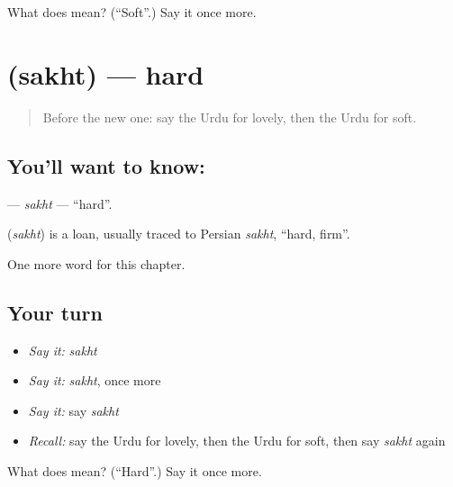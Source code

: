 \begin{tcolorbox}[breakable,colback=teal!4,colframe=teal!35!black,title={Before you move on}]
What does  mean? (\textquotedblleft{}Soft\textquotedblright{}.) Say it once more.
\end{tcolorbox}
\section[\texorpdfstring{\ur{سخت} (sakht)}{سخت (sakht)}]{ (sakht) — hard}

\label{lesson:UR-C133-sakht}



\begin{quote}
Before the new one: say the Urdu for lovely, then the Urdu for soft.
\end{quote}

\subsection*{You'll want to know: }
\textbf{} — \emph{sakht} — \textquotedblleft{}hard\textquotedblright{}.

\begin{cousinweb}
\textbf{} (\emph{sakht}) is a loan, usually traced to Persian \emph{sakht}, \textquotedblleft{}hard, firm\textquotedblright{}.
\end{cousinweb}

\begin{grammarlens}[title={What you've built}]
One more word for this chapter.
\end{grammarlens}

\subsection*{Your turn}
\begin{itemize}
\raggedright
  \item \emph{Say it:} \emph{sakht}
  \item \emph{Say it:} \emph{sakht}, once more
  \item \emph{Say it:} say \emph{sakht}
  \item \emph{Recall:} say the Urdu for lovely, then the Urdu for soft, then say \emph{sakht} again
\end{itemize}

\begin{tcolorbox}[breakable,colback=teal!4,colframe=teal!35!black,title={Before you move on}]
What does  mean? (\textquotedblleft{}Hard\textquotedblright{}.) Say it once more.
\end{tcolorbox}
